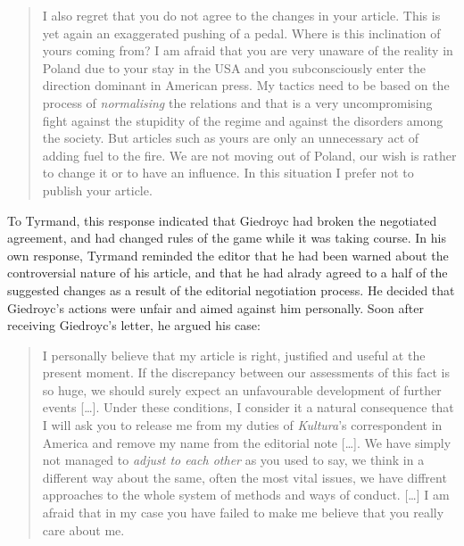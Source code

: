\begin{paper}
\begin{quote}
I also regret that you do not agree to the changes in your article.
This is yet again an exaggerated pushing of a pedal. Where is this
inclination of yours coming from? I am afraid that you are very unaware
of the reality in Poland due to your stay in the USA and you
subconsciously enter the direction dominant in American press. My
tactics need to be based on the process of \emph{normalising} the
relations and that is a very uncompromising fight against the stupidity
of the regime and against the disorders among the society. But articles
such as yours are only an unnecessary act of adding fuel to the fire. We
are not moving out of Poland, our wish is rather to change it or to have
an influence. In this situation I prefer not to publish your article.
\begin{flushright}
\citep[10 September 1968]{tyrmand_kor_1966}

\end{flushright}
\end{quote}

\noindent To Tyrmand, this response indicated that Giedroyc had broken the negotiated agreement, and had changed
rules of the game while it was taking course. In his own response, Tyrmand reminded the editor that he had
been warned about the controversial nature of his article, and that he had alrady agreed to a half of the suggested
changes as a
result of the editorial negotiation process. He decided that Giedroyc's actions were
unfair and aimed against him personally. Soon after receiving Giedroyc's letter, he argued his case:
\vspace{2em}

\begin{quote}
I personally believe that my article is right, justified and useful at
the present moment. If the discrepancy between our assessments of this
fact is so huge, we should surely expect an unfavourable development of
further events {[}\ldots{}{]}. Under these conditions, I consider it a
natural consequence that I will ask you to release me from my duties of
\emph{Kultura}'s correspondent in America and remove my name from the
editorial note {[}\ldots{}{]}. We have simply not managed to \emph{adjust to
each other} as you used to say, we think in a different way about the
same, often the most vital issues, we have diffrent approaches to the
whole system of methods and ways of conduct. {[}\ldots{}{]} I am afraid
that in my case you have failed to make me believe that you really care
about me.  
\begin{flushright}
\citep[13 September 1968]{tyrmand_kor_1966}
\end{flushright}
\end{quote}


\end{paper}
